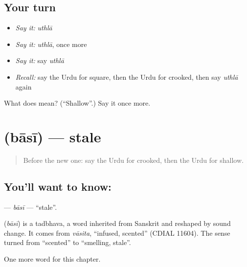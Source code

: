 \subsection*{Your turn}
\begin{itemize}
\raggedright
  \item \emph{Say it:} \emph{uthlā}
  \item \emph{Say it:} \emph{uthlā}, once more
  \item \emph{Say it:} say \emph{uthlā}
  \item \emph{Recall:} say the Urdu for square, then the Urdu for crooked, then say \emph{uthlā} again
\end{itemize}

\begin{tcolorbox}[breakable,colback=teal!4,colframe=teal!35!black,title={Before you move on}]
What does  mean? (\textquotedblleft{}Shallow\textquotedblright{}.) Say it once more.
\end{tcolorbox}
\section[\texorpdfstring{\ur{باسی} (bāsī)}{باسی (bāsī)}]{ (bāsī) — stale}

\label{lesson:UR-C194-basi}



\begin{quote}
Before the new one: say the Urdu for crooked, then the Urdu for shallow.
\end{quote}

\subsection*{You'll want to know: }
\textbf{} — \emph{bāsī} — \textquotedblleft{}stale\textquotedblright{}.

\begin{cousinweb}
\textbf{} (\emph{bāsī}) is a tadbhava, a word inherited from Sanskrit and reshaped by sound change. It comes from \emph{vāsita}, \textquotedblleft{}infused, scented\textquotedblright{} (CDIAL 11604). The sense turned from \textquotedblleft{}scented\textquotedblright{} to \textquotedblleft{}smelling, stale\textquotedblright{}.
\end{cousinweb}

\begin{grammarlens}[title={What you've built}]
One more word for this chapter.
\end{grammarlens}

